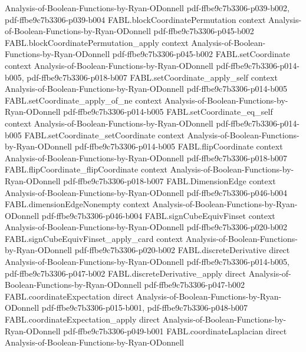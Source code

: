 \begin{theorem}
  {Analysis-of-Boolean-Functions-by-Ryan-ODonnell}
  {pdf-ffbe9c7b3306-p039-b002,
    pdf-ffbe9c7b3306-p039-b004}
\proofstep
  {FABL.blockCoordinatePermutation}
  {context}
  {Analysis-of-Boolean-Functions-by-Ryan-ODonnell}
  {pdf-ffbe9c7b3306-p045-b002}
\proofstep
  {FABL.blockCoordinatePermutation_apply}
  {context}
  {Analysis-of-Boolean-Functions-by-Ryan-ODonnell}
  {pdf-ffbe9c7b3306-p045-b002}
\proofstep
  {FABL.setCoordinate}
  {context}
  {Analysis-of-Boolean-Functions-by-Ryan-ODonnell}
  {pdf-ffbe9c7b3306-p014-b005,
    pdf-ffbe9c7b3306-p018-b007}
\proofstep
  {FABL.setCoordinate_apply_self}
  {context}
  {Analysis-of-Boolean-Functions-by-Ryan-ODonnell}
  {pdf-ffbe9c7b3306-p014-b005}
\proofstep
  {FABL.setCoordinate_apply_of_ne}
  {context}
  {Analysis-of-Boolean-Functions-by-Ryan-ODonnell}
  {pdf-ffbe9c7b3306-p014-b005}
\proofstep
  {FABL.setCoordinate_eq_self}
  {context}
  {Analysis-of-Boolean-Functions-by-Ryan-ODonnell}
  {pdf-ffbe9c7b3306-p014-b005}
\proofstep
  {FABL.setCoordinate_setCoordinate}
  {context}
  {Analysis-of-Boolean-Functions-by-Ryan-ODonnell}
  {pdf-ffbe9c7b3306-p014-b005}
\proofstep
  {FABL.flipCoordinate}
  {context}
  {Analysis-of-Boolean-Functions-by-Ryan-ODonnell}
  {pdf-ffbe9c7b3306-p018-b007}
\proofstep
  {FABL.flipCoordinate_flipCoordinate}
  {context}
  {Analysis-of-Boolean-Functions-by-Ryan-ODonnell}
  {pdf-ffbe9c7b3306-p018-b007}
\proofstep
  {FABL.DimensionEdge}
  {context}
  {Analysis-of-Boolean-Functions-by-Ryan-ODonnell}
  {pdf-ffbe9c7b3306-p046-b004}
\proofstep
  {FABL.dimensionEdgeNonempty}
  {context}
  {Analysis-of-Boolean-Functions-by-Ryan-ODonnell}
  {pdf-ffbe9c7b3306-p046-b004}
\proofstep
  {FABL.signCubeEquivFinset}
  {context}
  {Analysis-of-Boolean-Functions-by-Ryan-ODonnell}
  {pdf-ffbe9c7b3306-p020-b002}
\proofstep
  {FABL.signCubeEquivFinset_apply_card}
  {context}
  {Analysis-of-Boolean-Functions-by-Ryan-ODonnell}
  {pdf-ffbe9c7b3306-p020-b002}
\proofstep
  {FABL.discreteDerivative}
  {direct}
  {Analysis-of-Boolean-Functions-by-Ryan-ODonnell}
  {pdf-ffbe9c7b3306-p014-b005,
    pdf-ffbe9c7b3306-p047-b002}
\proofstep
  {FABL.discreteDerivative_apply}
  {direct}
  {Analysis-of-Boolean-Functions-by-Ryan-ODonnell}
  {pdf-ffbe9c7b3306-p047-b002}
\proofstep
  {FABL.coordinateExpectation}
  {direct}
  {Analysis-of-Boolean-Functions-by-Ryan-ODonnell}
  {pdf-ffbe9c7b3306-p015-b001,
    pdf-ffbe9c7b3306-p048-b007}
\proofstep
  {FABL.coordinateExpectation_apply}
  {direct}
  {Analysis-of-Boolean-Functions-by-Ryan-ODonnell}
  {pdf-ffbe9c7b3306-p049-b001}
\proofstep
  {FABL.coordinateLaplacian}
  {direct}
  {Analysis-of-Boolean-Functions-by-Ryan-ODonnell}

\end{theorem}
